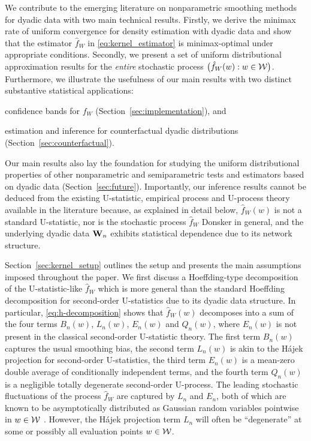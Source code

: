 We contribute to the emerging
literature on nonparametric smoothing methods
for dyadic data with two main technical
results. Firstly, we derive the minimax rate of uniform convergence for density
estimation with dyadic data and show that the estimator
$\hat{f}_W$ in \eqref{eq:kernel_estimator}
is minimax-optimal under appropriate conditions.
Secondly, we present a set of
uniform distributional approximation results
for the \emph{entire} stochastic process $\big(\hat{f}_W(w):w\in\mathcal{W}\big)$.
Furthermore, we illustrate the usefulness of our main results
with two distinct substantive statistical applications:
%
\begin{inlineroman}
\item
  confidence bands for $f_W$
  (Section~\ref{sec:implementation}), and
\item
  estimation and inference for counterfactual
  dyadic distributions (Section~\ref{sec:counterfactual}).
\end{inlineroman}
%
Our main results also lay the
foundation for studying the uniform distributional properties of other
nonparametric and semiparametric tests and estimators based on
dyadic data (Section~\ref{sec:future}).
Importantly, our inference
results cannot be deduced from the existing U-statistic, empirical process and
U-process theory available in the literature
\citep{van1996weak,gine2021mathematical} because,
as explained in detail below,
$\hat{f}_W(w)$ is not a standard U-statistic,
nor is the stochastic process $\hat{f}_W$ Donsker in general,
and the underlying dyadic data $\mathbf{W}_n$ exhibits
statistical dependence due to its network structure.

Section~\ref{sec:kernel_setup} outlines the setup and presents the main
assumptions
imposed throughout the paper. We first discuss a Hoeffding-type decomposition of
the U-statistic-like $\hat{f}_W$ which is more general than the standard
Hoeffding decomposition for second-order U-statistics due
to its dyadic data structure.
In particular,
\eqref{eq:h-decomposition} shows that $\hat{f}_W(w)$ decomposes into a sum
of the four terms $B_n(w)$, $L_n(w)$, $E_n(w)$ and $Q_n(w)$,
where $E_n(w)$ is not present in the classical second-order U-statistic theory.
The first term $B_n(w)$ captures the usual smoothing bias, the second term
$L_n(w)$ is akin to the H\'{a}jek projection for second-order U-statistics, the
third term $E_n(w)$ is a mean-zero double
average of conditionally independent terms,
and the fourth term $Q_n(w)$ is a negligible totally degenerate
second-order U-process.
The leading stochastic
fluctuations of the process $\hat{f}_W$
are captured by $L_n$ and $E_n$,
both of which are known to be asymptotically distributed
as Gaussian random variables pointwise in $w\in\mathcal{W}$ \citep{graham2022kernel}.
However, the H\'{a}jek projection term $L_n$ will often
be ``degenerate'' at some
or possibly all evaluation points $w\in\mathcal{W}$.

